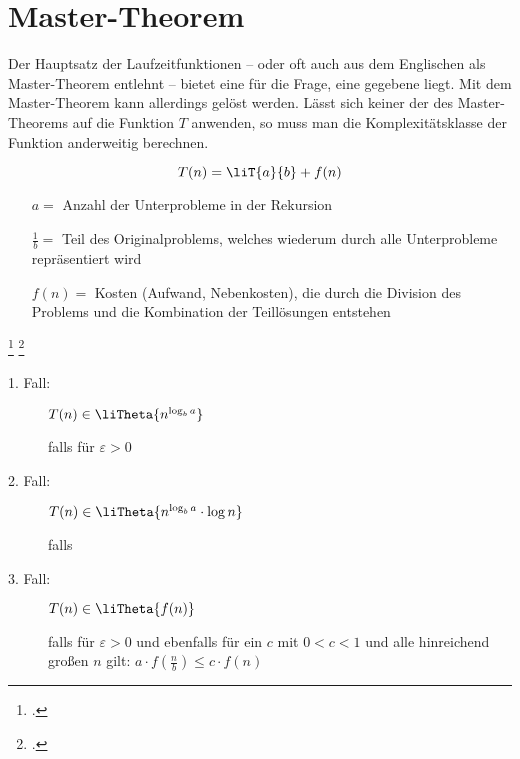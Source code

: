 \documentclass{lehramt-informatik-haupt}
\begin{document}
\let\O=\liO
\let\o=\liOmega
\let\T=\liT
\let\t=\liTheta


\section{Master-Theorem}

Der Hauptsatz der Laufzeitfunktionen – oder oft auch aus dem Englischen
als Master-Theorem entlehnt – bietet eine  für
die Frage,  eine gegebene
 liegt. Mit dem Master-Theorem kann
allerdings  gelöst
werden. Lässt sich keiner der  des
Master-Theorems auf die Funktion $T$ anwenden, so muss man die
Komplexitätsklasse der Funktion anderweitig berechnen.

\begin{displaymath}
T(n) = \T{a}{b} + f(n)
\end{displaymath}

\begin{itemize}
\item[$a =$]
Anzahl der Unterprobleme in der Rekursion

\item[$\textstyle{\frac{1}{b}} =$]
Teil des Originalproblems, welches wiederum durch alle Unterprobleme
repräsentiert wird

\item[$f(n) =$]
Kosten (Aufwand, Nebenkosten), die durch die Division des Problems und
die Kombination der Teillösungen entstehen
\end{itemize}
\footcite{wiki:master-theorem}
\footcite[Seite 19-35 (PDF 11-24)]{aud:fs:2}

\begin{description}
\item[1. Fall:]
$T(n) \in \t{n^{\log_{b}a}}$

\hfill falls \liBedingungEins
für $\varepsilon > 0$

\item[2. Fall:]
$T(n) \in \t{n^{\log_{b}a} \cdot \log n}$

\hfill falls \liBedingungZwei

\item[3. Fall:]
$T(n) \in \t{f(n)}$

\hfill falls \liBedingungDrei
für $\varepsilon > 0$
und ebenfalls für ein $c$ mit $0 < c < 1$ und alle hinreichend großen $n$
gilt:
$a \cdot f(\textstyle {\frac {n}{b}})\leq c \cdot f(n)$
\end{description}

\literatur
\end{document}
